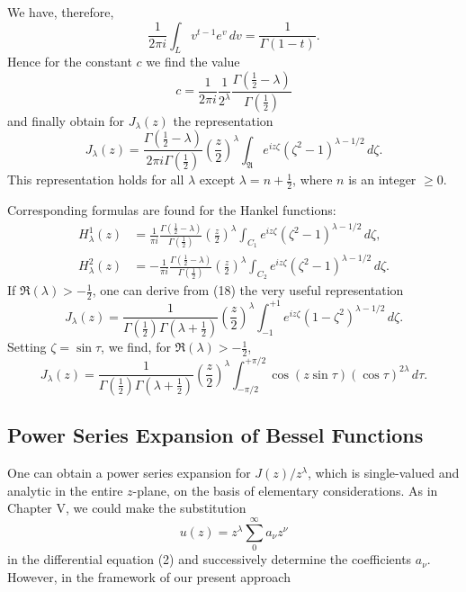 We have, therefore,
\[
\frac1{2\pi i}\int_L v^{t-1}e^v\,dv=\frac1{\Gamma(1-t)}.
\]
Hence for the constant $c$ we find the value
\[
c=\frac1{2\pi i}\frac1{2^\lambda}\frac{\Gamma(\tfrac12-\lambda)}{\Gamma(\tfrac12)}
\]
and finally obtain for $J_\lambda(z)$ the representation
\begin{equation}\tag{18}
J_\lambda(z)=\frac{\Gamma(\tfrac12-\lambda)}{2\pi i\Gamma(\tfrac12)}
\left(\frac z2\right)^\lambda
\int_{\mathfrak A}e^{iz\zeta}(\zeta^2-1)^{\lambda-1/2}\,d\zeta.
\end{equation}
This representation holds for all $\lambda$ except $\lambda=n+\tfrac12$, where $n$ is an integer $\ge0$.

Corresponding formulas are found for the Hankel functions:
\begin{equation}\tag{18'}
\begin{aligned}
H_\lambda^1(z)&=\frac1{\pi i}\frac{\Gamma(\tfrac12-\lambda)}{\Gamma(\tfrac12)}
\left(\frac z2\right)^\lambda\int_{C_1}e^{iz\zeta}(\zeta^2-1)^{\lambda-1/2}\,d\zeta,\\
H_\lambda^2(z)&=-\frac1{\pi i}\frac{\Gamma(\tfrac12-\lambda)}{\Gamma(\tfrac12)}
\left(\frac z2\right)^\lambda\int_{C_2}e^{iz\zeta}(\zeta^2-1)^{\lambda-1/2}\,d\zeta.
\end{aligned}
\end{equation}
If $\Re(\lambda)>-\tfrac12$, one can derive from (18) the very useful representation
\begin{equation}\tag{19}
J_\lambda(z)=\frac1{\Gamma(\tfrac12)\Gamma(\lambda+\tfrac12)}
\left(\frac z2\right)^\lambda
\int_{-1}^{+1}e^{iz\zeta}(1-\zeta^2)^{\lambda-1/2}\,d\zeta.
\end{equation}
Setting $\zeta=\sin\tau$, we find, for $\Re(\lambda)>-\tfrac12$,
\begin{equation}\tag{20}
J_\lambda(z)=\frac1{\Gamma(\tfrac12)\Gamma(\lambda+\tfrac12)}
\left(\frac z2\right)^\lambda
\int_{-\pi/2}^{+\pi/2}\cos(z\sin\tau)(\cos\tau)^{2\lambda}\,d\tau.
\end{equation}

\subsection{Power Series Expansion of Bessel Functions}
One can obtain a power series expansion for $J(z)/z^\lambda$, which is single-valued and analytic in the entire $z$-plane, on the basis of elementary considerations. As in Chapter V, we could make the substitution
\[
u(z)=z^\lambda\sum_0^\infty a_\nu z^\nu
\]
in the differential equation (2) and successively determine the coefficients $a_\nu$. However, in the framework of our present approach

